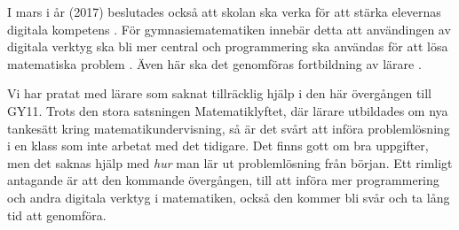 \textcolor{lila}{I mars i år (2017) beslutades också att skolan ska verka för att stärka elevernas digitala kompetens \cite{regeringen}. För gymnasiematematiken innebär detta att användingen av digitala verktyg ska bli mer central och programmering ska användas för att lösa matematiska problem \cite{itiskolan}. Även här ska det genomföras fortbildning av lärare \cite{prog_utbildning}.}
            
\textcolor{lila}{Vi har pratat med lärare som saknat tillräcklig hjälp i den här övergången till GY11. Trots den stora satsningen Matematiklyftet, där lärare utbildades om nya tankesätt kring matematikundervisning, så är det svårt att införa problemlösning i en klass som inte arbetat med det tidigare. Det finns gott om bra uppgifter, men det saknas hjälp med \emph{hur} man lär ut problemlösning från början. 
Ett rimligt antagande är att den kommande övergången, till att införa mer programmering och andra digitala verktyg i matematiken, också den kommer bli svår och ta lång tid att genomföra.}
